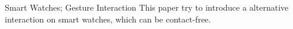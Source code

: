 
\begin{abstract}{智能手表; 手势交互}
本文设计了一套用于智能手表上的择备交互模式，能够释放双手。
\end{abstract}

\begin{abstractEng}{Smart Watches; Gesture Interaction}
This paper try to introduce a alternative interaction on smart watches, which can be contact-free.
\end{abstractEng}

